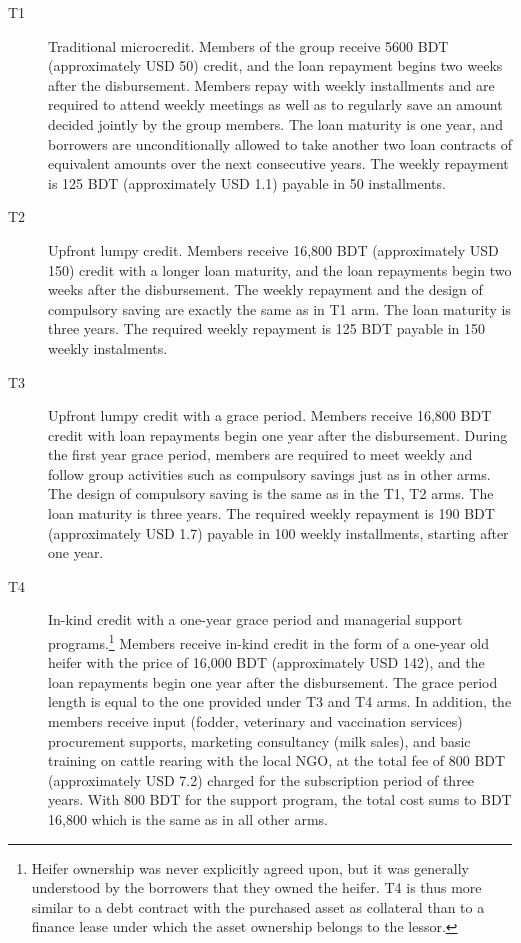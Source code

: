 	\begin{description}
	\vspace{1.0ex}\setlength{\itemsep}{1.0ex}\setlength{\baselineskip}{12pt}
	\item[T1]	Traditional microcredit. Members of the group receive 5600 BDT (approximately USD 50) credit, and the loan repayment begins two weeks after the disbursement. Members repay with weekly installments and are required to attend weekly meetings as well as to regularly save an amount decided jointly by the group members. The loan maturity is one year, and borrowers are unconditionally allowed to take another two loan contracts of equivalent amounts over the next consecutive years. The weekly repayment is 125 BDT (approximately USD 1.1) payable in 50 installments.
	\item[T2]	Upfront lumpy credit. Members receive 16,800 BDT (approximately USD 150) credit with a longer loan maturity, and the loan repayments begin two weeks after the disbursement. The weekly repayment and the design of compulsory saving are exactly the same as in \textsf{T1} arm. The loan maturity is three years. The required weekly repayment is 125 BDT payable in 150 weekly instalments. 
	\item[T3]	Upfront lumpy credit with a grace period. Members receive 16,800 BDT credit with loan repayments begin one year after the disbursement. During the first year grace period, members are required to meet weekly and follow group activities such as compulsory savings just as in other arms. The design of compulsory saving is the same as in the \textsf{T1}, \textsf{T2} arms. The loan maturity is three years. The required weekly repayment is 190 BDT (approximately USD 1.7) payable in 100 weekly installments, starting after one year.
	\item[T4]	In-kind credit with a one-year grace period and managerial support programs.\footnote{Heifer ownership was never explicitly agreed upon, but it was generally understood by the borrowers that they owned the heifer. T4 is thus more similar to a debt contract with the purchased asset as collateral than to a finance lease under which the asset ownership belongs to the lessor. } Members receive in-kind credit in the form of a one-year old heifer with the price of 16,000 BDT (approximately USD 142), and the loan repayments begin one year after the disbursement. The grace period length is equal to the one provided under \textsf{T3} and \textsf{T4} arms. In addition, the members receive input (fodder, veterinary and vaccination services) procurement supports, marketing consultancy (milk sales), and basic training on cattle rearing with the local NGO, at the total fee of 800 BDT (approximately USD 7.2) charged for the subscription period of three years. With 800 BDT for the support program, the total cost sums to BDT 16,800 which is the same as in all other arms.
	\end{description}

